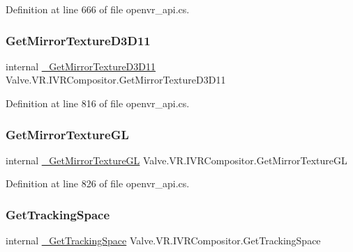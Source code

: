 Definition at line 666 of file openvr\+\_\+api.\+cs.

\mbox{\label{struct_valve_1_1_v_r_1_1_i_v_r_compositor_a9a72d670b1de214f0d2d6d8fd5ae46b4}} 
\subsubsection{\texorpdfstring{GetMirrorTextureD3D11}{GetMirrorTextureD3D11}}
{\footnotesize\ttfamily internal \mbox{\hyperlink{struct_valve_1_1_v_r_1_1_i_v_r_compositor_a9046a6da4f9d12e76f42e8476d698cc5}{\+\_\+\+Get\+Mirror\+Texture\+D3\+D11}} Valve.\+V\+R.\+I\+V\+R\+Compositor.\+Get\+Mirror\+Texture\+D3\+D11}



Definition at line 816 of file openvr\+\_\+api.\+cs.

\mbox{\label{struct_valve_1_1_v_r_1_1_i_v_r_compositor_a5519fa0d05576c6021df19c08c2e350f}} 
\subsubsection{\texorpdfstring{GetMirrorTextureGL}{GetMirrorTextureGL}}
{\footnotesize\ttfamily internal \mbox{\hyperlink{struct_valve_1_1_v_r_1_1_i_v_r_compositor_a99ed37ffd770d7a7e9f1cd1c843b0f91}{\+\_\+\+Get\+Mirror\+Texture\+GL}} Valve.\+V\+R.\+I\+V\+R\+Compositor.\+Get\+Mirror\+Texture\+GL}



Definition at line 826 of file openvr\+\_\+api.\+cs.

\mbox{\label{struct_valve_1_1_v_r_1_1_i_v_r_compositor_a66d7b3f8b2d98b50b94a7b6723593ab0}} 
\subsubsection{\texorpdfstring{GetTrackingSpace}{GetTrackingSpace}}
{\footnotesize\ttfamily internal \mbox{\hyperlink{struct_valve_1_1_v_r_1_1_i_v_r_compositor_a4a4568c4dfcd60444a4ab3b7bf47a019}{\+\_\+\+Get\+Tracking\+Space}} Valve.\+V\+R.\+I\+V\+R\+Compositor.\+Get\+Tracking\+Space}



